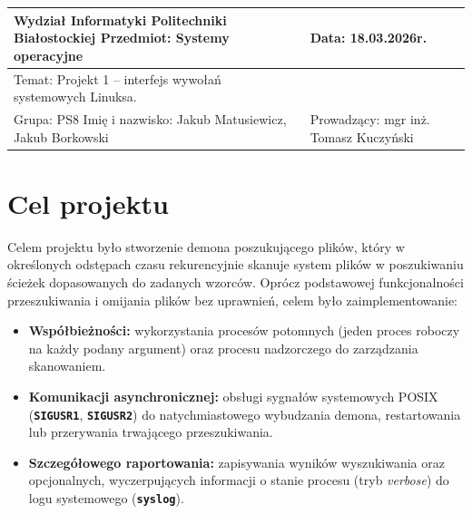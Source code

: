\documentclass{article}
\begin{document}
	
	\begin{center}
		
		\begin{tabular}{@{}|m{}|m{}|@{}}
			\hline
			Wydział Informatyki Politechniki Białostockiej \newline
			Przedmiot: Systemy operacyjne
			&
			Data: 18.03.2026r. \\ \hline
			
			Temat: Projekt 1 – interfejs wywołań systemowych Linuksa. \newline
			
			& %
			
			
			\\
			
			Grupa: PS8 \newline
			Imię i nazwisko: \newline
			Jakub Matusiewicz, Jakub Borkowski
			
			& %
			
			Prowadzący: \newline
			mgr inż. Tomasz Kuczyński \\ \hline
		\end{tabular}
	\end{center}
	
	\section{Cel projektu}
	
	Celem projektu było stworzenie demona poszukującego plików, który w określonych odstępach czasu rekurencyjnie skanuje system plików w poszukiwaniu ścieżek dopasowanych do zadanych wzorców. Oprócz podstawowej funkcjonalności przeszukiwania i omijania plików bez uprawnień, celem było zaimplementowanie:
	\begin{itemize}
		\item \textbf{Współbieżności:} wykorzystania procesów potomnych (jeden proces roboczy na każdy podany argument) oraz procesu nadzorczego do zarządzania skanowaniem.
		\item \textbf{Komunikacji asynchronicznej:} obsługi sygnałów systemowych POSIX (\textbf{\texttt{SIGUSR1}}, \textbf{\texttt{SIGUSR2}}) do natychmiastowego wybudzania demona, restartowania lub przerywania trwającego przeszukiwania.
		\item \textbf{Szczegółowego raportowania:} zapisywania wyników wyszukiwania oraz opcjonalnych, wyczerpujących informacji o stanie procesu (tryb \textit{verbose}) do logu systemowego (\textbf{\texttt{syslog}}).
	\end{itemize}
	
\end{document}
